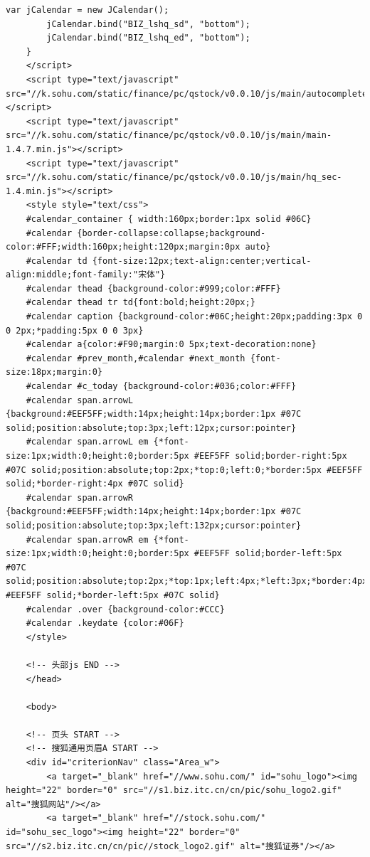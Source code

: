 \documentclass[UTF8,12pt]{article}
\begin{document}
\begin{lstlisting}[title=股票代码300117的界面html源码,frame=shadowbox]
        var jCalendar = new JCalendar();
        jCalendar.bind("BIZ_lshq_sd", "bottom");
        jCalendar.bind("BIZ_lshq_ed", "bottom");
    }
    </script>
    <script type="text/javascript" src="//k.sohu.com/static/finance/pc/qstock/v0.0.10/js/main/autocomplete.min.js"></script>
    <script type="text/javascript" src="//k.sohu.com/static/finance/pc/qstock/v0.0.10/js/main/main-1.4.7.min.js"></script>
    <script type="text/javascript" src="//k.sohu.com/static/finance/pc/qstock/v0.0.10/js/main/hq_sec-1.4.min.js"></script>
    <style style="text/css">
    #calendar_container { width:160px;border:1px solid #06C}
    #calendar {border-collapse:collapse;background-color:#FFF;width:160px;height:120px;margin:0px auto}
    #calendar td {font-size:12px;text-align:center;vertical-align:middle;font-family:"宋体"}
    #calendar thead {background-color:#999;color:#FFF}
    #calendar thead tr td{font:bold;height:20px;}
    #calendar caption {background-color:#06C;height:20px;padding:3px 0 0 2px;*padding:5px 0 0 3px}
    #calendar a{color:#F90;margin:0 5px;text-decoration:none}
    #calendar #prev_month,#calendar #next_month {font-size:18px;margin:0}
    #calendar #c_today {background-color:#036;color:#FFF}
    #calendar span.arrowL {background:#EEF5FF;width:14px;height:14px;border:1px #07C solid;position:absolute;top:3px;left:12px;cursor:pointer}
    #calendar span.arrowL em {*font-size:1px;width:0;height:0;border:5px #EEF5FF solid;border-right:5px #07C solid;position:absolute;top:2px;*top:0;left:0;*border:5px #EEF5FF solid;*border-right:4px #07C solid}
    #calendar span.arrowR {background:#EEF5FF;width:14px;height:14px;border:1px #07C solid;position:absolute;top:3px;left:132px;cursor:pointer}
    #calendar span.arrowR em {*font-size:1px;width:0;height:0;border:5px #EEF5FF solid;border-left:5px #07C solid;position:absolute;top:2px;*top:1px;left:4px;*left:3px;*border:4px #EEF5FF solid;*border-left:5px #07C solid}
    #calendar .over {background-color:#CCC}
    #calendar .keydate {color:#06F}
    </style>
    
    <!-- 头部js END -->
    </head>
    
    <body>
    
    <!-- 页头 START -->
    <!-- 搜狐通用页眉A START -->
    <div id="criterionNav" class="Area_w">
        <a target="_blank" href="//www.sohu.com/" id="sohu_logo"><img height="22" border="0" src="//s1.biz.itc.cn/cn/pic/sohu_logo2.gif" alt="搜狐网站"/></a>
        <a target="_blank" href="//stock.sohu.com/" id="sohu_sec_logo"><img height="22" border="0" src="//s2.biz.itc.cn/cn/pic//stock_logo2.gif" alt="搜狐证券"/></a>
    

\end{lstlisting}
\end{document}
